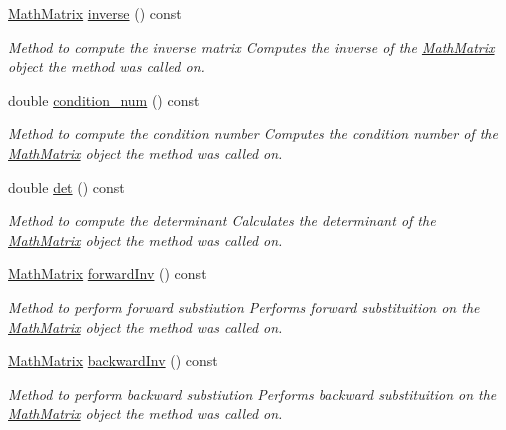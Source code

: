 \begin{DoxyCompactItemize}
\hyperlink{class_math_matrix}{Math\-Matrix} \hyperlink{class_math_matrix_a6cd7edf3565c9c278841ceeb0f8cd492}{inverse} () const 
\begin{DoxyCompactList}\small\item\em Method to compute the inverse matrix Computes the inverse of the \hyperlink{class_math_matrix}{Math\-Matrix} object the method was called on. \end{DoxyCompactList}\item 
double \hyperlink{class_math_matrix_a0e0797f57fd4b35b48c16fddf101120a}{condition\-\_\-num} () const 
\begin{DoxyCompactList}\small\item\em Method to compute the condition number Computes the condition number of the \hyperlink{class_math_matrix}{Math\-Matrix} object the method was called on. \end{DoxyCompactList}\item 
double \hyperlink{class_math_matrix_aa3c89c50387c203071eabb163988134b}{det} () const 
\begin{DoxyCompactList}\small\item\em Method to compute the determinant Calculates the determinant of the \hyperlink{class_math_matrix}{Math\-Matrix} object the method was called on. \end{DoxyCompactList}\item 
\hyperlink{class_math_matrix}{Math\-Matrix} \hyperlink{class_math_matrix_a3f4fdf320195fc4430c0ef0a691f359e}{forward\-Inv} () const 
\begin{DoxyCompactList}\small\item\em Method to perform forward substiution Performs forward substituition on the \hyperlink{class_math_matrix}{Math\-Matrix} object the method was called on. \end{DoxyCompactList}\item 
\hyperlink{class_math_matrix}{Math\-Matrix} \hyperlink{class_math_matrix_abfbc51f66f76a0e8911df1b591cd0671}{backward\-Inv} () const 
\begin{DoxyCompactList}\small\item\em Method to perform backward substiution Performs backward substituition on the \hyperlink{class_math_matrix}{Math\-Matrix} object the method was called on. \end{DoxyCompactList}\end{DoxyCompactItemize}
